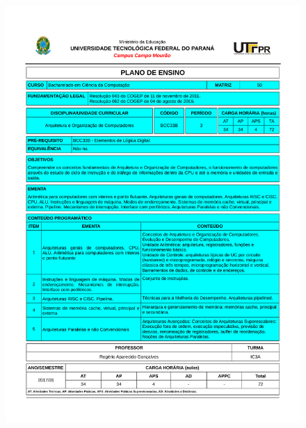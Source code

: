 \documentclass{beamer}
\begin{document}
\begin{frame}[allowframebreaks]
\begin{minipage}[t][\textheight][t]{\textwidth}
\begin{columns}
\begin{figure}
				\includegraphics[page=2,trim=2.0cm 3.0cm 2.0cm 3.0cm, scale=0.3]{figures/plano-ensino-BCC33B-IC3A}
			\end{figure}
	\end{columns}
	\end{minipage}
\end{frame}
\end{document}
